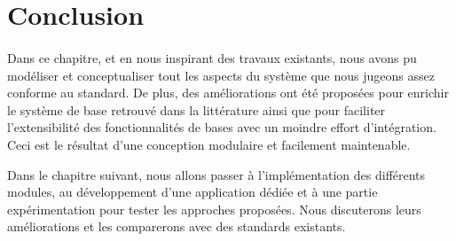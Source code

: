 \section{Conclusion}
\paragraph{}
Dans ce chapitre, et en nous inspirant des travaux existants, nous avons pu modéliser et conceptualiser tout les aspects du système que nous jugeons assez conforme au standard. De plus, des améliorations ont été proposées pour enrichir le système de base retrouvé dans la littérature ainsi que pour faciliter l'extensibilité des fonctionnalités de bases avec un moindre effort d'intégration. Ceci est le résultat d'une conception modulaire et facilement maintenable. 
\par Dans le chapitre suivant, nous allons passer à l'implémentation des différents modules, au développement d'une application dédiée et à une partie expérimentation pour tester les approches proposées. Nous discuterons leurs améliorations et les comparerons avec des standards existants.

